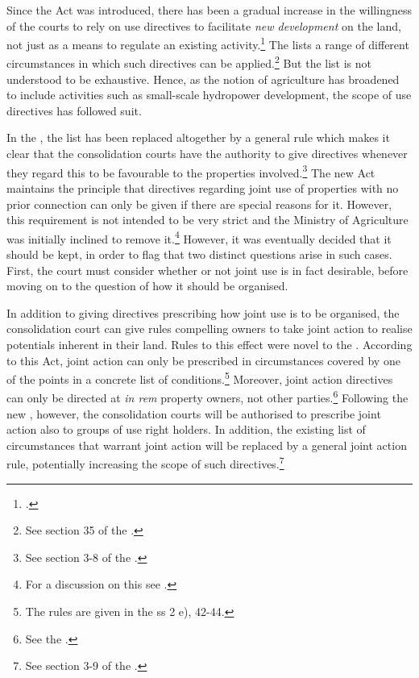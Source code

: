 Since the Act was introduced, there has been a gradual increase in the willingness of the courts to rely on use directives to facilitate \emph{new development} on the land, not just as a means to regulate an existing activity.\footcite[103]{otprp57} The \cite{lca79} lists a range of different circumstances in which such directives can be applied.\footnote{See section 35 of the \cite{lca79}.} But the list is not understood to be exhaustive. Hence, as the notion of agriculture has broadened to include activities such as small-scale hydropower development, the scope of use directives has followed suit.

In the \cite{lca13}, the list has been replaced altogether by a general rule which makes it clear that the consolidation courts have the authority to give directives whenever they regard this to be favourable to the properties involved.\footnote{See section 3-8 of the \cite{lca13}.}  The new Act maintains the principle that directives regarding joint use of properties with no prior connection can only be given if there are special reasons for it. However, this requirement is not intended to be very strict and the Ministry of Agriculture was initially inclined to remove it.\footnote{For a discussion on this see \cite[140-141]{prop12}.} However, it was eventually decided that it should be kept, in order to flag that two distinct questions arise in such cases. First, the court must consider whether or not joint use is in fact desirable, before moving on to the question of how it should be organised.

In addition to giving directives prescribing how joint use is to be organised, the consolidation court can give rules compelling owners to take joint action to realise potentials inherent in their land. Rules to this effect were novel to the \cite{lca79}. According to this Act, joint action can only be prescribed in circumstances covered by one of the points in a concrete list of conditions.\footnote{The rules are given in the \cite{lca79} ss 2 e), 42-44.} Moreover, joint action directives can only be directed at {\it in rem} property owners, not other parties.\footnote{See the \dni\cite[34 a)]{lca79}.} Following the new \cite{lca13}, however, the consolidation courts will be authorised to prescribe joint action also to groups of use right holders. In addition, the existing list of circumstances that warrant joint action will be replaced by a general joint action rule, potentially increasing the scope of such directives.\footnote{See section 3-9 of the \cite{lca13}.}

